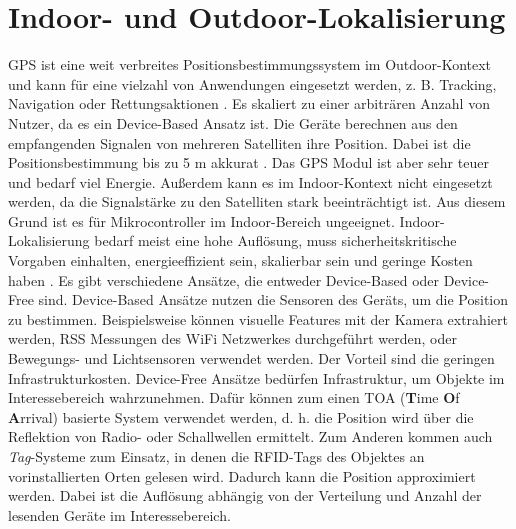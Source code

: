 \section{Indoor- und Outdoor-Lokalisierung}
GPS ist eine weit verbreites Positionsbestimmungssystem im Outdoor-Kontext  und kann für eine vielzahl von Anwendungen eingesetzt werden,
z. B. Tracking, Navigation oder Rettungsaktionen \cite{kaplan2005understanding}.
Es skaliert zu einer arbiträren Anzahl von Nutzer, da es ein Device-Based Ansatz ist.
Die Geräte berechnen aus den empfangenden Signalen von mehreren Satelliten ihre Position.
Dabei ist die Positionsbestimmung bis zu 5 m akkurat \cite{sadowski2018rssi}.
Das GPS Modul ist aber sehr teuer und bedarf viel Energie.
Außerdem kann es im Indoor-Kontext nicht eingesetzt werden, da die Signalstärke zu den Satelliten stark beeinträchtigt ist.
Aus diesem Grund ist es für Mikrocontroller im Indoor-Bereich ungeeignet.
\newline
\newline
Indoor-Lokalisierung bedarf meist eine hohe Auflösung, muss sicherheitskritische Vorgaben einhalten,
energieeffizient sein, skalierbar sein und geringe Kosten haben \cite{xiao2016survey}.
Es gibt verschiedene Ansätze, die entweder Device-Based oder Device-Free sind.
\newline
\newline
Device-Based Ansätze nutzen die Sensoren des Geräts, um die Position zu bestimmen.
Beispielsweise können visuelle Features mit der Kamera extrahiert werden,
RSS Messungen des WiFi Netzwerkes durchgeführt werden, oder Bewegungs- und Lichtsensoren verwendet werden.
Der Vorteil sind die geringen Infrastrukturkosten.
\newline
\newline
Device-Free Ansätze bedürfen Infrastruktur, um Objekte im Interessebereich wahrzunehmen.
Dafür können zum einen TOA (\textbf{T}ime \textbf{O}f \textbf{A}rrival) basierte System verwendet werden, d. h. die Position wird über
die Reflektion von Radio- oder Schallwellen ermittelt.
Zum Anderen kommen auch \textit{Tag}-Systeme zum Einsatz, in denen die RFID-Tags des Objektes an vorinstallierten Orten gelesen wird.
Dadurch kann die Position approximiert werden.
Dabei ist die Auflösung abhängig von der Verteilung und Anzahl der lesenden Geräte im Interessebereich.
